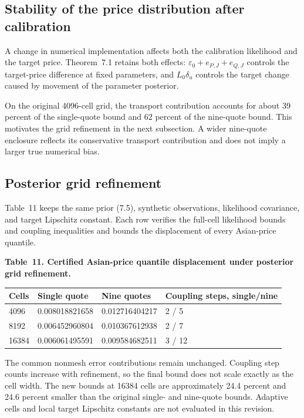 \subsection{Stability of the price distribution after calibration}

A change in numerical implementation affects both the calibration likelihood and the
target price. Theorem~7.1 retains both effects:
\(\varepsilon_0+e_{P,J}+e_{Q,J}\) controls the target-price difference at fixed parameters,
and \(L_0\delta_u\) controls the target change caused by movement of the parameter posterior.

On the original 4096-cell grid, the transport contribution accounts for about
39 percent of the single-quote bound and 62 percent of the nine-quote bound.
This motivates the grid refinement in the next subsection. A wider nine-quote
enclosure reflects its conservative transport contribution and does not imply
a larger true numerical bias.

\subsection{Posterior grid refinement}

Table~11 keeps the same prior (7.5), synthetic observations, likelihood
covariance, and target Lipschitz constant. Each row verifies the full-cell
likelihood bounds and coupling inequalities and bounds the displacement of
every Asian-price quantile.

\noindent\textbf{Table~11. Certified Asian-price quantile displacement under posterior grid refinement.}
\begin{center}
\begin{tabularx}{\textwidth}{@{}l X X X@{}}
\toprule
Cells & Single quote & Nine quotes & Coupling steps, single/nine \\
\midrule
4096 & 0.008018821658 & 0.012716404217 & 2 / 5 \\
8192 & 0.006452960804 & 0.010367612938 & 2 / 7 \\
16384 & 0.006061495591 & 0.009584682511 & 3 / 12 \\
\bottomrule
\end{tabularx}
\end{center}

The common nonmesh error contributions remain unchanged. Coupling step counts increase with
refinement, so the final bound does not scale exactly as the cell width. The
new bounds at 16384 cells are approximately 24.4 percent and 24.6 percent smaller
than the original single- and nine-quote bounds. Adaptive cells and local target
Lipschitz constants are not evaluated in this revision.

